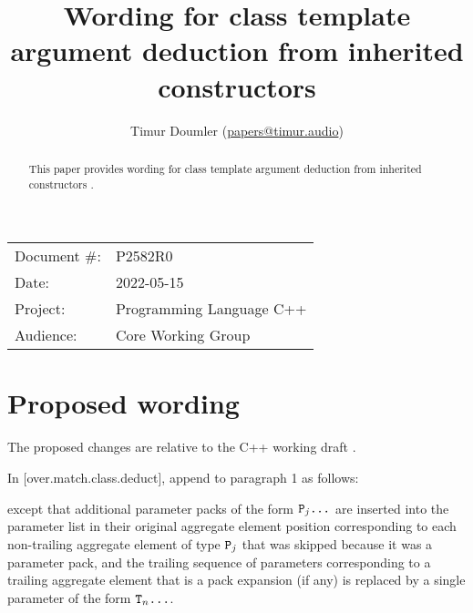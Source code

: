 

\newcommand{\forceindent}{\parindent=1em\indent\parindent=0pt\relax} %



\title{Wording for class template argument deduction from inherited constructors}
\author{
  Timur Doumler \small(\href{mailto:papers@timur.audio}{papers@timur.audio})
}
\date{}
\maketitle

\begin{tabular}{ll}
Document \#: & P2582R0 \\
Date: & 2022-05-15\\
Project: & Programming Language C++ \\
Audience: & Core Working Group
\end{tabular}


\begin{abstract}
This paper provides wording for class template argument deduction from inherited constructors \cite{P1021R6}.
\end{abstract}

\section{Proposed wording}

The proposed changes are relative to the C++ working draft \cite{N4910}. 

In [over.match.class.deduct], append to paragraph 1 as follows:

\begin{adjustwidth}{0.5cm}{0.5cm}
except that additional parameter packs of the form $\texttt{P}_j \texttt{...}$
are inserted into the parameter list in their original aggregate element position corresponding to each non-trailing aggregate element of type $\texttt{P}_j$
that was skipped because it was a parameter pack, and
the trailing sequence of parameters corresponding
to a trailing aggregate element that is a pack expansion (if any)
is replaced by a single parameter of the form $\texttt{T}_n \texttt{...}$.

\end{adjustwidth}

